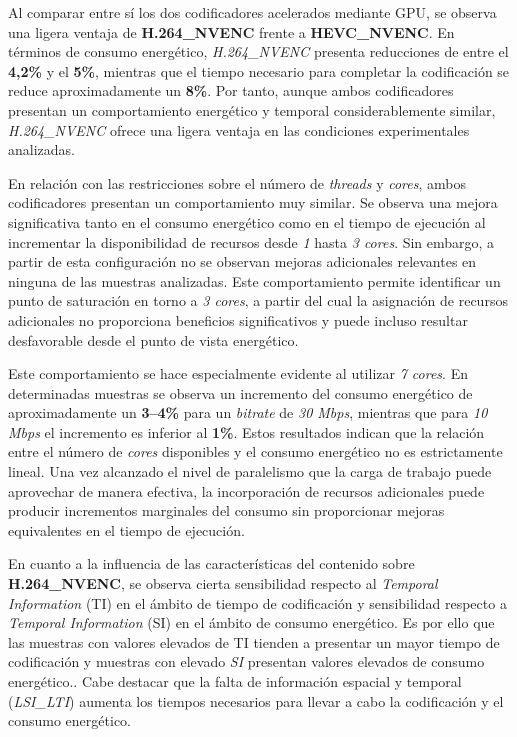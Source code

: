  Al comparar entre sí los dos codificadores acelerados mediante GPU, se observa una ligera ventaja de \textbf{H.264\_NVENC} frente a \textbf{HEVC\_NVENC}. En términos de consumo energético, \textit{H.264\_NVENC} presenta reducciones de entre el \textbf{4,2\%} y el \textbf{5\%}, mientras que el tiempo necesario para completar la codificación se reduce aproximadamente un \textbf{8\%}. Por tanto, aunque ambos codificadores presentan un comportamiento energético y temporal considerablemente similar, \textit{H.264\_NVENC} ofrece una ligera ventaja en las condiciones experimentales analizadas.

 En relación con las restricciones sobre el número de \textit{threads} y \textit{cores}, ambos codificadores presentan un comportamiento muy similar. Se observa una mejora significativa tanto en el consumo energético como en el tiempo de ejecución al incrementar la disponibilidad de recursos desde \textit{1} hasta \textit{3 cores}. Sin embargo, a partir de esta configuración no se observan mejoras adicionales relevantes en ninguna de las muestras analizadas. Este comportamiento permite identificar un punto de saturación en torno a \textit{3 cores}, a partir del cual la asignación de recursos adicionales no proporciona beneficios significativos y puede incluso resultar desfavorable desde el punto de vista energético.
 
 Este comportamiento se hace especialmente evidente al utilizar \textit{7 cores}. En determinadas muestras se observa un incremento del consumo energético de aproximadamente un \textbf{3--4\%} para un \textit{bitrate} de \textit{30 Mbps}, mientras que para \textit{10 Mbps} el incremento es inferior al \textbf{1\%}. Estos resultados indican que la relación entre el número de \textit{cores} disponibles y el consumo energético no es estrictamente lineal. Una vez alcanzado el nivel de paralelismo que la carga de trabajo puede aprovechar de manera efectiva, la incorporación de recursos adicionales puede producir incrementos marginales del consumo sin proporcionar mejoras equivalentes en el tiempo de ejecución.

 En cuanto a la influencia de las características del contenido sobre \textbf{H.264\_NVENC}, se observa cierta sensibilidad respecto al \textit{Temporal Information} (TI) en el ámbito de tiempo de codificación y sensibilidad respecto a \textit{Temporal Information} (SI) en el ámbito de consumo energético. Es por ello que las muestras con valores elevados de TI tienden a presentar un mayor tiempo de codificación y muestras con elevado \textit{SI} presentan valores elevados de consumo energético.. Cabe destacar que la falta de información espacial y temporal (\textit{LSI\_LTI}) aumenta los tiempos necesarios para llevar a cabo la codificación y el consumo energético. 

